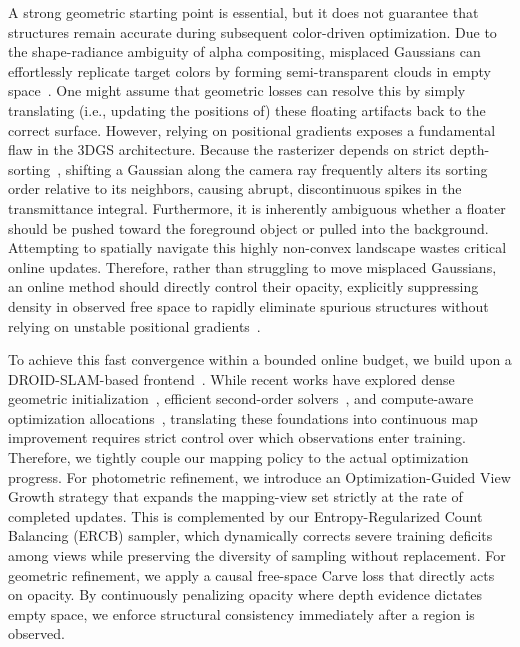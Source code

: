 A strong geometric starting point is essential, but it does not guarantee that structures remain accurate during subsequent color-driven optimization. Due to the shape-radiance ambiguity of alpha compositing, misplaced Gaussians can effortlessly replicate target colors by forming semi-transparent clouds in empty space~\cite{deng2022dsnerf, stablegs, wang2025efags}. One might assume that geometric losses can resolve this by simply translating (i.e., updating the positions of) these floating artifacts back to the correct surface. However, relying on positional gradients exposes a fundamental flaw in the 3DGS architecture. Because the rasterizer depends on strict depth-sorting~\cite{kerbl20233dgs}, shifting a Gaussian along the camera ray frequently alters its sorting order relative to its neighbors, causing abrupt, discontinuous spikes in the transmittance integral. Furthermore, it is inherently ambiguous whether a floater should be pushed toward the foreground object or pulled into the background. Attempting to spatially navigate this highly non-convex landscape wastes critical online updates. Therefore, rather than struggling to move misplaced Gaussians, an online method should directly control their opacity, explicitly suppressing density in observed free space to rapidly eliminate spurious structures without relying on unstable positional gradients~\cite{yu2024gof, guedon2023sugar, pagas2026}.

To achieve this fast convergence within a bounded online budget, we build upon a DROID-SLAM-based frontend~\cite{teed2021droid}. While recent works have explored dense geometric initialization~\cite{edgs}, efficient second-order solvers~\cite{hollein2025gslm}, and compute-aware optimization allocations~\cite{cartgs, chen2024pgsr}, translating these foundations into continuous map improvement requires strict control over which observations enter training. Therefore, we tightly couple our mapping policy to the actual optimization progress. For photometric refinement, we introduce an Optimization-Guided View Growth strategy that expands the mapping-view set strictly at the rate of completed updates. This is complemented by our Entropy-Regularized Count Balancing (ERCB) sampler, which dynamically corrects severe training deficits among views while preserving the diversity of sampling without replacement. For geometric refinement, we apply a causal free-space Carve loss that directly acts on opacity. By continuously penalizing opacity where depth evidence dictates empty space, we enforce structural consistency immediately after a region is observed.

